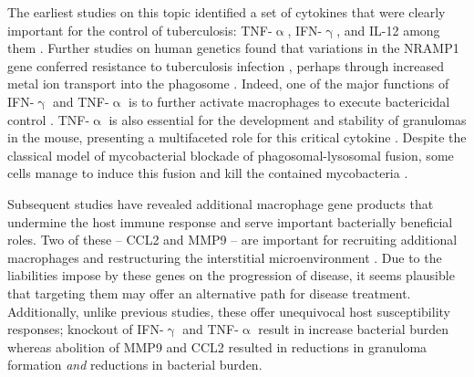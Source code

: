 The earliest studies on this topic identified a set of cytokines that were clearly important for the control of tuberculosis: TNF\hyp{}$\upalpha$, IFN\hyp{}$\upgamma$, and IL\hyp{}12 among them \citep{Flynn1993, Flynn1995, Cooper1993, Cooper1997}. Further studies on human genetics found that variations in the NRAMP1 gene conferred resistance to tuberculosis infection \citep{Bellamy1998}, perhaps through increased metal ion transport into the phagosome \citep{Davies2001a}. Indeed, one of the major functions of IFN\hyp{}$\upgamma$ and TNF\hyp{}$\upalpha$ is to further activate macrophages to execute bactericidal control \citep{Kaufmann2002}. TNF\hyp{}$\upalpha$ is also essential for the development and stability of granulomas in the mouse, presenting a multifaceted role for this critical cytokine \citep{Chakravarty2008}. Despite the classical model of mycobacterial blockade of phagosomal\hyp{}lysosomal fusion, some cells manage to induce this fusion and kill the contained mycobacteria \citep{Kaufmann2002}. 

Subsequent studies have revealed additional macrophage gene products that undermine the host immune response and serve important bacterially beneficial roles. Two of these -- CCL2 and MMP9 -- are important for recruiting additional macrophages and restructuring the interstitial microenvironment \citep{Cambier2014b, Volkman2010}. Due to the liabilities impose by these genes on the progression of disease, it seems plausible that targeting them may offer an alternative path for disease treatment. Additionally, unlike previous studies, these offer unequivocal host susceptibility responses; knockout of IFN\hyp{}$\upgamma$ and TNF\hyp{}$\upalpha$ result in increase bacterial burden whereas abolition of MMP9 and CCL2 resulted in reductions in granuloma formation \textit{and} reductions in bacterial burden.

